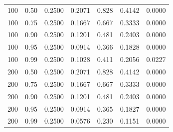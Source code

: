 \begin{tabular}{ccccccc}
\midrule
100 & 0.50 & 0.2500 & 0.2071 & 0.828 & 0.4142 & 0.0000 \\
100 & 0.75 & 0.2500 & 0.1667 & 0.667 & 0.3333 & 0.0000 \\
100 & 0.90 & 0.2500 & 0.1201 & 0.481 & 0.2403 & 0.0000 \\
100 & 0.95 & 0.2500 & 0.0914 & 0.366 & 0.1828 & 0.0000 \\
100 & 0.99 & 0.2500 & 0.1028 & 0.411 & 0.2056 & 0.0227 \\
\midrule
200 & 0.50 & 0.2500 & 0.2071 & 0.828 & 0.4142 & 0.0000 \\
200 & 0.75 & 0.2500 & 0.1667 & 0.667 & 0.3333 & 0.0000 \\
200 & 0.90 & 0.2500 & 0.1201 & 0.481 & 0.2403 & 0.0000 \\
200 & 0.95 & 0.2500 & 0.0914 & 0.365 & 0.1827 & 0.0000 \\
200 & 0.99 & 0.2500 & 0.0576 & 0.230 & 0.1151 & 0.0000 \\
\bottomrule
\end{tabular}